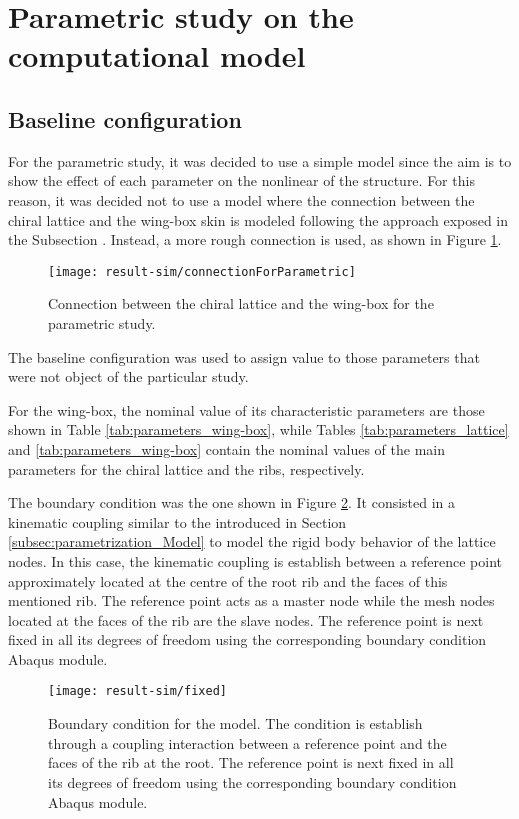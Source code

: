
\section{Parametric study on the computational model} \label{sec:computationalParametricStudy_Results_sim}
%

\subsection{Baseline configuration} \label{sec:baselineConfig_Results_sim}

For the parametric study, it was decided to use a simple model since the aim is to show the effect of each parameter on the nonlinear of the structure. For this reason, it was decided not to use a model where the connection between the chiral lattice and the wing-box skin is modeled following the approach exposed in the Subsection \label{subsec:connections_computationalModel}. Instead, a more rough connection is used, as shown in Figure \ref{fig:connectionForParametric}. 

\begin{figure}[!htpb]
  \centering
  \texttt{[image: result-sim/connectionForParametric]}
  \caption[Connection between the chiral lattice and the wing-box for the parametric study]{Connection between the chiral lattice and the wing-box for the parametric study.}\label{fig:connectionForParametric}
\end{figure}

The baseline configuration was used to assign value to those parameters that were not object of the particular study.

For the wing-box, the nominal value of its characteristic parameters are those shown in Table \ref{tab:parameters_wing-box}, while Tables \ref{tab:parameters_lattice} and \ref{tab:parameters_wing-box} contain the nominal values of the main parameters for the chiral lattice and the ribs, respectively.

The boundary condition was the one shown in Figure \ref{fig:fixed}. It consisted in a kinematic coupling similar to the introduced in Section \ref{subsec:parametrization_Model} to model the rigid body behavior of the lattice nodes. In this case, the kinematic coupling is establish between a reference point approximately located at the centre of the root rib and the faces of this mentioned rib. The reference point acts as a master node while the mesh nodes located at the faces of the rib are the slave nodes. The reference point is next fixed in all its degrees of freedom using the corresponding boundary condition Abaqus module.

\begin{figure}[!htpb]
  \centering
  \texttt{[image: result-sim/fixed]}
  \caption[Boundary condition for the model]{Boundary condition for the model. The condition is establish through a coupling interaction between a reference point and the faces of the rib at the root. The reference point is next fixed in all its degrees of freedom using the corresponding boundary condition Abaqus module.}\label{fig:fixed}
\end{figure}